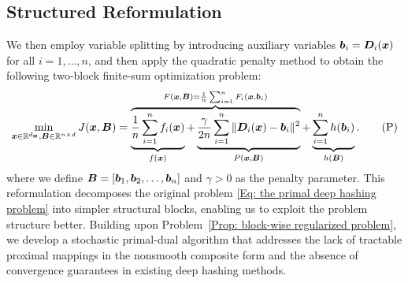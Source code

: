 \subsection{Structured Reformulation}
We then employ variable splitting by introducing auxiliary variables \(\bm{b}_i=\bm{D}_i(\bm{x})\) for all \(i=1,\dots,n\), and then apply the quadratic penalty method to obtain the following two-block finite-sum optimization problem:
\begin{align}
    \label{Prop: block-wise regularized problem}
    \min_{\bm{x} \in \mathbb{R}^{d_{\bm{x}}}, \bm{B} \in \mathbb{R}^{n\times d}} J(\bm{x}, \bm{B}) = \overbrace{\underbrace{\frac{1}{n}\sum_{i=1}^n f_i(\bm{x})}_{f(\bm{x})} + \underbrace{\frac{\gamma}{2n} \sum_{i=1}^n \| \bm{D}_i(\bm{x}) - \bm{b}_i\|^2}_{P(\bm{x}, \bm{B})}}^{F(\bm{x}, \bm{B}) = \frac{1}{n}\sum_{i=1}^n F_i(\bm{x}, \bm{b}_i)} + \underbrace{\sum_{i=1}^n h(\bm{b}_i)}_{h(\bm{B})}. \tag{P}
\end{align}
where we define \( \bm{B} = [\bm{b}_1, \bm{b}_2, \dots, \bm{b}_n]\) and \( \gamma > 0 \) as the penalty parameter. This reformulation decomposes the original problem \eqref{Eq: the primal deep hashing problem} into simpler structural blocks, enabling us to exploit the problem structure better.
Building upon Problem~\eqref{Prop: block-wise regularized problem}, we develop a stochastic primal-dual algorithm {that addresses the lack of tractable proximal mappings in the nonsmooth composite form and the absence of convergence guarantees in existing deep hashing methods.}
